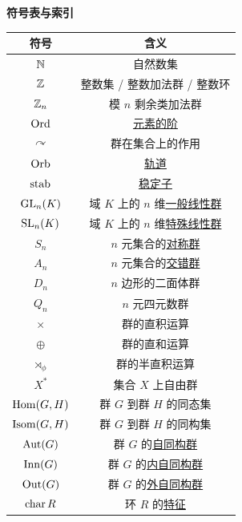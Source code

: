 \begin{center}
    {\LARGE \textbf{符号表与索引}}
    \vspace{2em}\\
    \begin{tabular}{c|c}
        \toprule
        \textbf{符号} & \textbf{含义} \\
        \midrule
        \(\operatorname{\mathbb{N}}\) & 自然数集 \\
        \(\operatorname{\mathbb{Z}}\) & 整数集 / 整数加法群 / 整数环 \\
        \(\operatorname{\mathbb{Z}}_n\) & 模 \(n\) 剩余类加法群 \\
        \(\operatorname{Ord}\) & \hyperref[dfn:Order]{元素的阶} \\
        \(\curvearrowright\) & 群在集合上的作用 \\
        \(\operatorname{Orb}\) & \hyperref[dfn:Orbit]{轨道} \\
        \(\operatorname{stab}\) & \hyperref[dfn:Stabilizer]{稳定子} \\
        \(\operatorname{GL}_n(K)\) & 域 \(K\) 上的 \(n\) 维\hyperref[xmp:GL]{一般线性群} \\
        \(\operatorname{SL}_n(K)\) & 域 \(K\) 上的 \(n\) 维\hyperref[xmp:SL]{特殊线性群} \\
        \(S_n\) & \(n\) 元集合的\hyperref[dfn:SymmetricGroup]{对称群} \\
        \(A_n\) & \(n\) 元集合的\hyperref[dfn:AlternatingGroup]{交错群} \\
        \(D_n\) & \(n\) 边形的二面体群 \\
        \(Q_n\) & \(n\) 元四元数群 \\
        \(\times\) & 群的直积运算 \\
        \(\oplus\) & 群的直和运算 \\
        \(\rtimes_\phi\) & 群的半直积运算 \\
        \(X^*\) & 集合 \(X\) 上自由群 \\
        \(\operatorname{Hom}(G,H)\) & 群 \(G\) 到群 \(H\) 的同态集 \\
        \(\operatorname{Isom}(G,H)\) & 群 \(G\) 到群 \(H\) 的同构集 \\
        \(\operatorname{Aut}(G)\) & 群 \(G\) 的\hyperref[dfn:GroupAutomorphism]{自同构群} \\
        \(\operatorname{Inn}(G)\) & 群 \(G\) 的\hyperref[dfn:InnerAutomorphismGroup]{内自同构群} \\
        \(\operatorname{Out}(G)\) & 群 \(G\) 的\hyperref[dfn:OuterAutomorphismGroup]{外自同构群} \\
        \(\operatorname{char} R\) & 环 \(R\) 的\hyperref[dfn:Characteristic]{特征} \\

\end{tabular}
\end{center}

